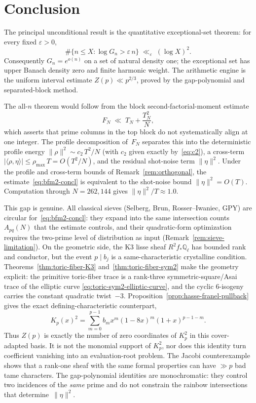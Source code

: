 \documentclass[11pt]{article}
\theoremstyle{definition}
\theoremstyle{remark}
\begin{document}




\section{Conclusion}

The principal unconditional result is the quantitative
exceptional-set theorem:
for every fixed $\varepsilon > 0$,
\[
  \#\{n \le X : \log G_n > \varepsilon\, n\}
  \;\ll_\varepsilon\;
  (\log X)^2.
\]
Consequently $G_n = e^{o(n)}$ on a set of natural
density one; the exceptional set has upper Banach
density zero and finite harmonic weight.
The arithmetic engine is the uniform interval
estimate $Z(p) \ll p^{2/3}$, proved by the
gap-polynomial and separated-block method.

The all-$n$ theorem would follow from the block
second-factorial-moment estimate
\begin{equation}\label{eq:bfm2-concl}
  F_N \;\ll\; T_N + \frac{T_N^2}{N},
\end{equation}
which asserts that prime columns in the
top block do not systematically align at
one integer.
The profile decomposition of~$F_N$ separates
this into the deterministic profile energy
$\|\rho\|^2 \sim c_2\,T^2/N$
(with $c_2$ given exactly by~\eqref{eq:c2}),
a cross-term
$|\langle\rho,\eta\rangle|
\le \rho_{\max}\,T = O(T^2/N)$,
and the residual shot-noise term
$\|\eta\|^2$.
Under the profile and cross-term bounds of
Remark~\ref{rem:orthogonal}, the
estimate~\eqref{eq:bfm2-concl} is equivalent to the
shot-noise bound $\|\eta\|^2=O(T)$.
Computation through $N = 262{,}144$
gives $\|\eta\|^2/T \approx 1.0$.

This gap is genuine.
All classical sieves (Selberg, Brun,
Rosser--Iwaniec, GPY) are circular
for~\eqref{eq:bfm2-concl}: they expand
into the same intersection counts
$A_{pq}(N)$ that the estimate controls,
and their quadratic-form optimization
requires the two-prime level of
distribution as input
(Remark~\ref{rem:sieve-limitation}).
On the geometric side, the K3 lisse
sheaf $R^2f_*\mathbb{Q}_\ell$
has bounded rank and conductor, but
the event $p \mid b_j$ is a
same-characteristic crystalline condition.
Theorems~\ref{thm:toric-fiber-K3}
and~\ref{thm:toric-fiber-sym2} make the geometry explicit:
the primitive toric-fiber trace is a rank-three
symmetric-square/Asai trace of the elliptic curve
\eqref{eq:toric-sym2-elliptic-curve}, and the cyclic
$6$-isogeny carries the constant quadratic twist~$-3$.
Proposition~\ref{prop:hasse-franel-pullback} gives the exact
defining-characteristic counterpart,
\[
 K_p(x)^2
 =\sum_{m=0}^{p-1}b_m
 x^m(1-8x)^m(1+x)^{p-1-m}.
\]
Thus $Z(p)$ is exactly the number of zero coordinates of
$K_p^2$ in this cover-adapted basis.  It is not the monomial
support of $K_p^2$, nor does this identity turn coefficient
vanishing into an evaluation-root problem.
The Jacobi counterexample shows that
a rank-one sheaf with the same formal
properties can have $\gg p$ bad tame
characters.
The gap-polynomial identities are
monochromatic: they control two
incidences of the \emph{same} prime
and do not constrain the rainbow
intersections that determine~$\|\eta\|^2$.
\end{document}
